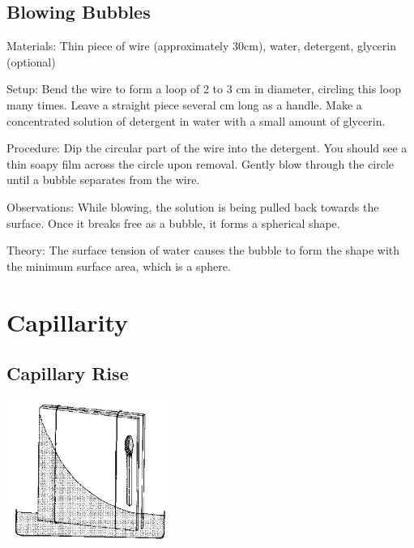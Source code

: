 \begin{multicols}{2}
\subsection{Blowing Bubbles}
\begin{description*}
\item[Materials:]{Thin piece of wire (approximately 30cm), water, detergent, glycerin (optional)}
\item[Setup:]{Bend the wire to form a loop of 2 to 3 cm in diameter, circling this loop many times. Leave a straight piece several cm long as a handle. Make a concentrated solution of detergent in water with a small amount of glycerin.}
\item[Procedure:]{Dip the circular part of the wire into the detergent. You should see a thin soapy film across the circle upon removal. Gently blow through the circle until a bubble separates from the wire.}
\item[Observations:]{While blowing, the solution is being pulled back towards the surface. Once it breaks free as a bubble, it forms a spherical shape.}
\item[Theory:]{The surface tension of water causes the bubble to form the shape with the minimum surface area, which is a sphere.}
\end{description*}

\columnbreak


\section*{Capillarity} 


\subsection{Capillary Rise}

\begin{center}
\includegraphics[width=0.4\textwidth]{./img/source/capillary-glass.jpg}
\end{center}


\end{multicols}
